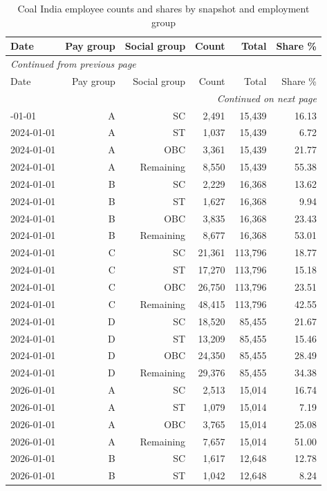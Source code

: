 \documentclass[11pt,a4paper]{report}
\begin{document}
\begin{longtable}{lrrrrr}
\caption{Coal India employee counts and shares by snapshot and employment group}\\\toprule
Date & Pay group & Social group & Count & Total & Share \% \\\midrule\endfirsthead
\multicolumn{6}{l}{\textit{Continued from previous page}}\\\toprule
Date & Pay group & Social group & Count & Total & Share \% \\\midrule\endhead
\midrule\multicolumn{6}{r}{\textit{Continued on next page}}\\\endfoot\bottomrule\endlastfoot
2024-01-01 & A & SC & 2,491 & 15,439 & 16.13 \\
2024-01-01 & A & ST & 1,037 & 15,439 & 6.72 \\
2024-01-01 & A & OBC & 3,361 & 15,439 & 21.77 \\
2024-01-01 & A & Remaining & 8,550 & 15,439 & 55.38 \\
2024-01-01 & B & SC & 2,229 & 16,368 & 13.62 \\
2024-01-01 & B & ST & 1,627 & 16,368 & 9.94 \\
2024-01-01 & B & OBC & 3,835 & 16,368 & 23.43 \\
2024-01-01 & B & Remaining & 8,677 & 16,368 & 53.01 \\
2024-01-01 & C & SC & 21,361 & 113,796 & 18.77 \\
2024-01-01 & C & ST & 17,270 & 113,796 & 15.18 \\
2024-01-01 & C & OBC & 26,750 & 113,796 & 23.51 \\
2024-01-01 & C & Remaining & 48,415 & 113,796 & 42.55 \\
2024-01-01 & D & SC & 18,520 & 85,455 & 21.67 \\
2024-01-01 & D & ST & 13,209 & 85,455 & 15.46 \\
2024-01-01 & D & OBC & 24,350 & 85,455 & 28.49 \\
2024-01-01 & D & Remaining & 29,376 & 85,455 & 34.38 \\
2026-01-01 & A & SC & 2,513 & 15,014 & 16.74 \\
2026-01-01 & A & ST & 1,079 & 15,014 & 7.19 \\
2026-01-01 & A & OBC & 3,765 & 15,014 & 25.08 \\
2026-01-01 & A & Remaining & 7,657 & 15,014 & 51.00 \\
2026-01-01 & B & SC & 1,617 & 12,648 & 12.78 \\
2026-01-01 & B & ST & 1,042 & 12,648 & 8.24 \\

\end{longtable}
\end{document}
